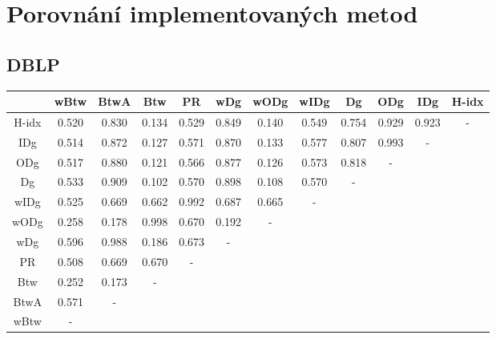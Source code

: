 \documentclass[12pt,titlepage]{report}
\begin{document}
\section{Porovnání implementovaných metod}
\subsection{DBLP}
\begin{footnotesize}
\begin{center}
\begin{tabular}{|c|c|c|c|c|c|c|c|c|c|c|c|}
\hline
& wBtw  & BtwA  & Btw   & PR    & wDg  & wODg & wIDg & Dg   & ODg  & IDg  & H-idx \\
\hline
H-idx  & 0.520 & 0.830 & 0.134 & 0.529 & 0.849 & 0.140 & 0.549 & 0.754 & 0.929 & 0.923 & - \\
\cline{1-12}
IDg   & 0.514 & 0.872 & 0.127 & 0.571 & 0.870 & 0.133 & 0.577 & 0.807 & 0.993 & - \\
\cline{1-11}
ODg   & 0.517 & 0.880 & 0.121 & 0.566 & 0.877 & 0.126 & 0.573 & 0.818 & - \\
\cline{1-10}
Dg    & 0.533 & 0.909 & 0.102 & 0.570 & 0.898 & 0.108 & 0.570 & - \\
\cline{1-9}
wIDg  & 0.525 & 0.669 & 0.662 & 0.992 & 0.687 & 0.665 & - \\
\cline{1-8}
wODg  & 0.258 & 0.178 & 0.998 & 0.670 & 0.192 & - \\
\cline{1-7}
wDg   & 0.596 & 0.988 & 0.186 & 0.673 & - \\
\cline{1-6}
PR     & 0.508 & 0.669 & 0.670 & - \\
\cline{1-5}
Btw    & 0.252 & 0.173 & - \\
\cline{1-4}
BtwA   & 0.571 & - \\
\cline{1-3}
wBtw   &  - \\
\cline{1-2}
\end{tabular}
\end{center}
\end{footnotesize}
\end{document}
